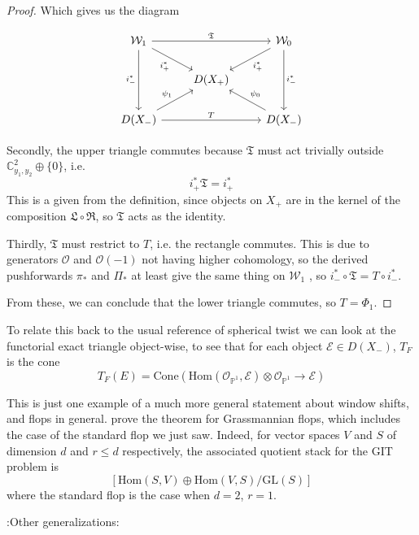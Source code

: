 \begin{proof}
Which gives us the diagram

\[\begin{tikzcd}
	{\mathcal{W}_1} && {\mathcal{W}_0} \\
	& {D(X_+ )} \\
	{D(X_- )} && {D(X_- )}
	\arrow["{\mathfrak T}", from=1-1, to=1-3]
	\arrow["{i_+^*}"', from=1-1, to=2-2]
	\arrow["{i_- ^*}"', from=1-1, to=3-1]
	\arrow["{i_+^*}", from=1-3, to=2-2]
	\arrow["{i_- ^*}", from=1-3, to=3-3]
	\arrow["{\psi_1}", from=3-1, to=2-2]
	\arrow["T", from=3-1, to=3-3]
	\arrow["{\psi_0}"', from=3-3, to=2-2]
\end{tikzcd}\]

Secondly, the upper triangle commutes because $\mathfrak{T}$ must act trivially outside $\mathbb{C}^{2}_{y_{1},y_{2}}\oplus \{ 0 \}$, i.e. $$
i^{*}_{+}\mathfrak{T} = i^{*}_{+}
$$This is a given from the definition, since objects on $X_+$ are in the kernel of the composition $\mathfrak{L}\circ\mathfrak{R}$, so $\mathfrak{T}$ acts as the identity. 

Thirdly,  $\mathfrak{T}$ must restrict to $T$, i.e. the rectangle commutes. This is due to generators $\mathcal{O}$ and $\mathcal{O}(-1)$ not having higher cohomology, so the derived pushforwards $\pi_{*}$ and $\Pi_{*}$ at least give the same thing on $\mathcal{W}_1$ , so $i_{-}^{*}\circ \mathfrak{T} = T\circ i_{-}^{*}$. 

From these, we can conclude that the lower triangle commutes, so $T = \Phi_1$. 
\end{proof}

To relate this back to the usual reference of spherical twist we can look at the functorial exact triangle object-wise, to see that for each object $\mathcal{E}\in D(X_-)$, $T_F$ is the cone $$
T_{F}(E) = \mathrm{Cone}\left( \mathrm{Hom}(\mathcal{O}_{\mathbb{P}^{1}},\mathcal{E}) \otimes  \mathcal{O}_{\mathbb{P}^{1}} \to \mathcal{E}\right) 
$$ 

\begin{remark}{}{}
	This is just one example of a much more general statement about window shifts, and flops in general. \cite*{donovan_window_2014} prove the theorem for Grassmannian flops, which includes the case of the standard flop we just saw. Indeed, for  vector spaces $V$ and $S$ of dimension $d$ and $r \leq d$ respectively, the associated quotient stack for the GIT problem is $$
	\left[ \mathrm{Hom} (S,V) \oplus \mathrm{Hom}(V,S)/\mathrm{GL}(S) \right] 
	$$where the standard flop is the case when $d = 2$, $r=1$.
	\end{remark}


:Other generalizations:




